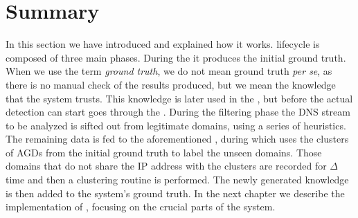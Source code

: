 \section{Summary} %
\label{sec:approach_summary}
In this section we have introduced \thesystem and explained how it works.
\thesystem lifecycle is composed of three main phases. During the
 it produces the initial ground truth. When we
use the term \emph{ground truth}, we do not mean ground truth \emph{per se},
as there is no manual check of the results produced, but we mean the knowledge
that the system trusts. This knowledge is later used in the , but before the actual detection can start \thesystem goes through
the . During the filtering phase the DNS stream
to be analyzed is sifted out from legitimate domains, using a series of
heuristics. The remaining data is fed to the aforementioned
, during which \thesystem uses the clusters of AGDs from
the initial ground truth to label the unseen domains. Those domains that do not
share the IP address with the clusters are recorded for $\Delta$ time and then a clustering routine is performed. The newly generated knowledge is then added to
the system's ground truth.
In the next chapter we describe the implementation of \thesystem, focusing
on the crucial parts of the system.
